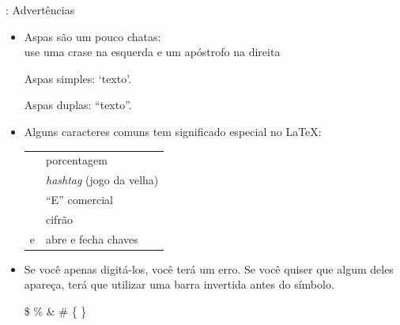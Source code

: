 \documentclass{beamer}
\begin{document}
\begin{frame}[fragile]{\insertsubsection{}: Advertências}
\small
\begin{itemize}
  \item Aspas são um pouco chatas:\\use uma crase  na esquerda e um apóstrofo  na direita
  \begin{exampletwouptiny}
  Aspas simples: `texto'.

  Aspas duplas: ``texto''.
  \end{exampletwouptiny}

  \item Alguns caracteres comuns tem significado especial no  \LaTeX:\\[1ex]
  \begin{tabular}{ll}
    \keystrokebftt{\%} & porcentagem                    \\
    \keystrokebftt{\#} & \emph{hashtag} (jogo da velha) \\
    \keystrokebftt{\&} & ``E'' comercial                \\
    \keystrokebftt{\$} & cifrão                         \\
    \keystrokebftt{\{} e \keystrokebftt{\}} & abre e fecha chaves \\
  \end{tabular}
  \item Se você apenas digitá-los, você terá um erro. Se você quiser que algum deles apareça, terá que utilizar uma barra invertida antes do símbolo.
  \begin{exampletwoup}
\$ \% \& \# \{ \}
  \end{exampletwoup}
\end{itemize}
\end{frame}
\end{document}

